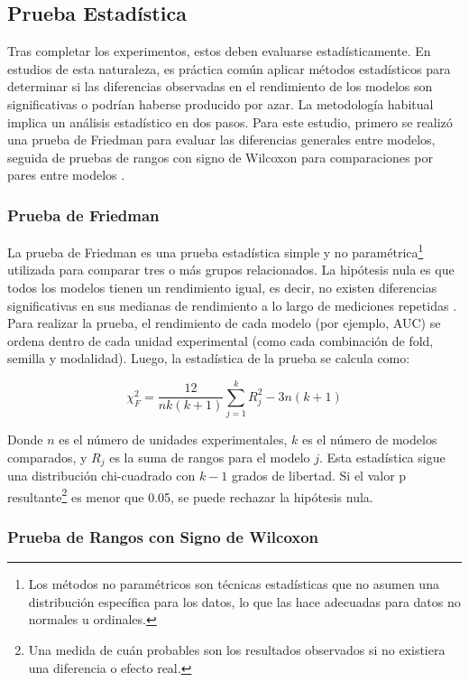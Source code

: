 \documentclass[a4paper,10pt]{book}
\begin{document}
\subsection{Prueba Estadística}

Tras completar los experimentos, estos deben evaluarse estadísticamente. En estudios de esta naturaleza, es práctica común aplicar métodos estadísticos para determinar si las diferencias observadas en el rendimiento de los modelos son significativas o podrían haberse producido por azar. La metodología habitual implica un análisis estadístico en dos pasos. Para este estudio, primero se realizó una prueba de Friedman para evaluar las diferencias generales entre modelos, seguida de pruebas de rangos con signo de Wilcoxon para comparaciones por pares entre modelos \cite{demsar_statistical_2006}.

\subsubsection{Prueba de Friedman}

La prueba de Friedman es una prueba estadística simple y no paramétrica\footnote{Los métodos no paramétricos son técnicas estadísticas que no asumen una distribución específica para los datos, lo que las hace adecuadas para datos no normales u ordinales.} utilizada para comparar tres o más grupos relacionados. La hipótesis nula es que todos los modelos tienen un rendimiento igual, es decir, no existen diferencias significativas en sus medianas de rendimiento a lo largo de mediciones repetidas \cite{demsar_statistical_2006}. Para realizar la prueba, el rendimiento de cada modelo (por ejemplo, AUC) se ordena dentro de cada unidad experimental (como cada combinación de fold, semilla y modalidad). Luego, la estadística de la prueba se calcula como:

\begin{equation}
\chi^2_F = \frac{12}{nk(k+1)} \sum_{j=1}^{k} R_j^2 - 3n(k+1)
\end{equation}

\noindent
Donde $n$ es el número de unidades experimentales, $k$ es el número de modelos comparados, y $R_j$ es la suma de rangos para el modelo $j$. Esta estadística sigue una distribución chi-cuadrado con $k-1$ grados de libertad. Si el valor p resultante\footnote{Una medida de cuán probables son los resultados observados si no existiera una diferencia o efecto real.} es menor que 0.05, se puede rechazar la hipótesis nula.

\subsubsection{Prueba de Rangos con Signo de Wilcoxon}
\end{document}
